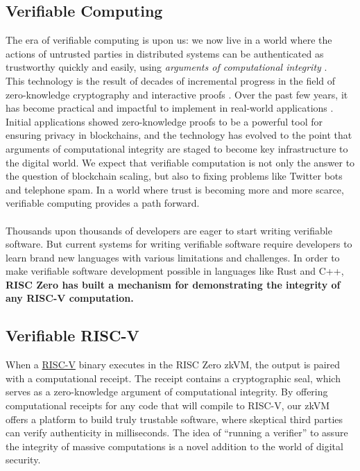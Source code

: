 \documentclass[10pt,letterpaper,titlepage]{article}
\theoremstyle{definition}
\begin{document}
\subsection{Verifiable Computing}
The era of verifiable computing is upon us: we now live in a world where the actions of untrusted parties in distributed systems can be authenticated as trustworthy quickly and easily, using \textit{arguments of computational integrity} \cite{stark}. \\
This technology is the result of decades of incremental progress in the field of zero-knowledge cryptography and interactive proofs \cite{zkp,pcp,iop}. 
Over the past few years, it has become practical and impactful to implement in real-world applications \cite{zcash,ethSTARK}. 
Initial applications showed zero-knowledge proofs to be a powerful tool for ensuring privacy in blockchains, and the technology has evolved to the point that arguments of computational integrity are staged to become key infrastructure to the digital world.
We expect that verifiable computation is not only the answer to the question of blockchain scaling, but also to fixing problems like Twitter bots and telephone spam. 
In a world where trust is becoming more and more scarce, verifiable computing provides a path forward. \\
\\
Thousands upon thousands of developers are eager to start writing verifiable software.
But current systems for writing verifiable software require developers to learn brand new languages with various limitations and challenges. 
In order to make verifiable software development possible in languages like Rust and C++, \textbf{RISC Zero has built a mechanism for demonstrating the integrity of any RISC-V computation.} 

\subsection{Verifiable RISC-V}
When a \href{https://riscv.org/} {RISC-V} binary executes in the RISC Zero zkVM, the output is paired with a computational receipt.
The receipt contains a cryptographic seal, which serves as a zero-knowledge argument of computational integrity. 
By offering computational receipts for any code that will compile to RISC-V, our zkVM offers a platform to build truly trustable software, where skeptical third parties can verify authenticity in milliseconds. The idea of ``running a verifier'' to assure the integrity of massive computations is a novel addition to the world of digital security.
\end{document}
